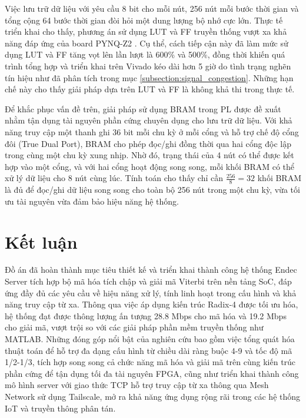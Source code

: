 \documentclass[../DoAn.tex]{subfiles}
\begin{document}
Việc lưu trữ dữ liệu với yêu cầu 8 bit cho mỗi nút, 256 nút mỗi bước thời gian và tổng cộng 64 bước thời gian đòi hỏi một dung lượng bộ nhớ cực lớn. Thực tế triển khai cho thấy, phương án sử dụng LUT và FF truyền thống vượt xa khả năng đáp ứng của board PYNQ-Z2 \cite{noauthor_aup_nodate}. Cụ thể, cách tiếp cận này đã làm mức sử dụng LUT và FF tăng vọt lên lần lượt là 600\% và 500\%, đồng thời khiến quá trình tổng hợp và triển khai trên Vivado kéo dài hơn 5 giờ do tình trạng nghẽn tín hiệu như đã phân tích trong mục \ref{subsection:signal_congestion}. Những hạn chế này cho thấy giải pháp dựa trên LUT và FF là không khả thi trong thực tế.

Để khắc phục vấn đề trên, giải pháp sử dụng BRAM trong PL được đề xuất nhằm tận dụng tài nguyên phần cứng chuyên dụng cho lưu trữ dữ liệu. Với khả năng truy cập một thanh ghi 36 bit mỗi chu kỳ ở mỗi cổng và hỗ trợ chế độ cổng đôi (True Dual Port), BRAM cho phép đọc/ghi đồng thời qua hai cổng độc lập trong cùng một chu kỳ xung nhịp. Nhờ đó, trạng thái của 4 nút có thể được kết hợp vào một cổng, và với hai cổng hoạt động song song, mỗi khối BRAM có thể xử lý dữ liệu cho 8 nút cùng lúc. Tính toán cho thấy chỉ cần $\frac{256}{8} = 32$ khối BRAM là đủ để đọc/ghi dữ liệu song song cho toàn bộ 256 nút trong một chu kỳ, vừa tối ưu tài nguyên vừa đảm bảo hiệu năng hệ thống.

\section{Kết luận}

Đồ án đã hoàn thành mục tiêu thiết kế và triển khai thành công hệ thống Endec Server tích hợp bộ mã hóa tích chập và giải mã Viterbi trên nền tảng SoC, đáp ứng đầy đủ các yêu cầu về hiệu năng xử lý, tính linh hoạt trong cấu hình và khả năng truy cập từ xa. Thông qua việc áp dụng kiến trúc Radix-4 được tối ưu hóa, hệ thống đạt được thông lượng ấn tượng 28.8 Mbps cho mã hóa và 19.2 Mbps cho giải mã, vượt trội so với các giải pháp phần mềm truyền thống như MATLAB. Những đóng góp nổi bật của nghiên cứu bao gồm việc tổng quát hóa thuật toán để hỗ trợ đa dạng cấu hình từ chiều dài ràng buộc 4-9 và tốc độ mã 1/2-1/3, tích hợp song song cả chức năng mã hóa và giải mã trên cùng kiến trúc phần cứng để tận dụng tối đa tài nguyên FPGA, cũng như triển khai thành công mô hình server với giao thức TCP hỗ trợ truy cập từ xa thông qua Mesh Network sử dụng Tailscale, mở ra khả năng ứng dụng rộng rãi trong các hệ thống IoT và truyền thông phân tán.
\end{document}
